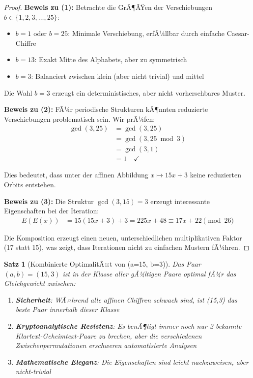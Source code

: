 ﻿\documentclass[12pt,a4paper]{article}
\newtheorem{theorem}{Satz}
\begin{document}
	\begin{proof}
		\textbf{Beweis zu (1):}
		Betrachte die GrÃ¶ÃŸen der Verschiebungen $b \in \{1, 2, 3, \ldots, 25\}$:
		\begin{itemize}
			\item $b = 1$ oder $b = 25$: Minimale Verschiebung, erfÃ¼llbar durch einfache Caesar-Chiffre
			\item $b = 13$: Exakt Mitte des Alphabets, aber zu symmetrisch
			\item $b = 3$: Balanciert zwischen klein (aber nicht trivial) und mittel
		\end{itemize}
		
		Die Wahl $b = 3$ erzeugt ein deterministisches, aber nicht vorhersehbares Muster.
		
		\textbf{Beweis zu (2):}
		FÃ¼r periodische Strukturen kÃ¶nnten reduzierte Verschiebungen problematisch sein. Wir prÃ¼fen:
		\begin{align}
			\gcd(3, 25) &= \gcd(3, 25) \\
			&= \gcd(3, 25 \bmod 3) \\
			&= \gcd(3, 1) \\
			&= 1 \quad \checkmark
		\end{align}
		
		Dies bedeutet, dass unter der affinen Abbildung $x \mapsto 15x + 3$ keine reduzierten Orbits entstehen.
		
		\textbf{Beweis zu (3):}
		Die Struktur $\gcd(3, 15) = 3$ erzeugt interessante Eigenschaften bei der Iteration:
		\begin{align}
			E(E(x)) &= 15(15x + 3) + 3 = 225x + 48 \equiv 17x + 22 \pmod{26}
		\end{align}
		
		Die Komposition erzeugt einen neuen, unterschiedlichen multiplikativen Faktor (17 statt 15), was zeigt, dass Iterationen nicht zu einfachen Mustern fÃ¼hren.
	\end{proof}
	
	\begin{theorem}[Kombinierte OptimalitÃ¤t von (a=15, b=3)]
		Das Paar $(a, b) = (15, 3)$ ist in der Klasse aller gÃ¼ltigen Paare optimal fÃ¼r das Gleichgewicht zwischen:
		\begin{enumerate}
			\item \textbf{Sicherheit}: WÃ¤hrend alle affinen Chiffren schwach sind, ist (15,3) das beste Paar innerhalb dieser Klasse
			\item \textbf{Kryptoanalytische Resistenz}: Es benÃ¶tigt immer noch nur 2 bekannte Klartext-Geheimtext-Paare zu brechen, aber die verschiedenen Zwischenpermutationen erschweren automatisierte Analysen
			\item \textbf{Mathematische Eleganz}: Die Eigenschaften sind leicht nachzuweisen, aber nicht-trivial
		\end{enumerate}
	\end{theorem}
	
\end{document}
